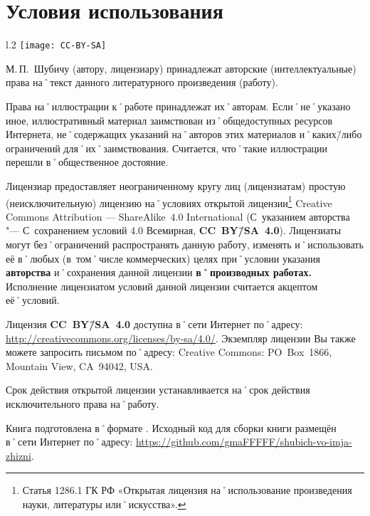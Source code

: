 ﻿%
\chapter{Условия использования}

\begin{wrapfigure}{l}{.2\textwidth}
\centering
\texttt{[image: CC-BY-SA]}
\label{fig:CC-BY-SA}
\end{wrapfigure}

\noindent М.\,П.~Шубичу (автору, лицензиару) принадлежат авторские (интеллектуальные) права на˚текст данного литературного произведения (работу). 

\noindent Права на˚иллюстрации к˚работе принадлежат их˚авторам. Если˚не˚указано иное, иллюстративный материал заимствован из˚общедоступных ресурсов Интернета, не˚содержащих указаний на˚авторов этих материалов и˚каких\=/либо ограничений для˚их˚заимствования. Считается, что˚такие иллюстрации перешли в˚общественное достояние.

Лицензиар предоставляет неограниченному кругу лиц (лицензиатам) простую (неисключительную) лицензию на˚условиях открытой лицензии\footnote
{Статья 1286.1 ГК РФ «Открытая лицензия на˚использование произведения науки, литературы или˚искусства».}
\foreignlanguage{english}{Creative Commons Attribution --- ShareAlike~4.0 International} (С~указанием авторства "--- С~сохранением условий 4.0 Всемирная, \textbf{CC~BY\=/SA~4.0}). Лицензиаты могут без˚ограничений распространять данную работу, изменять и˚использовать её в˚любых (в~том˚числе коммерческих) целях при˚условии указания \textbf{авторства} и˚сохранения данной лицензии \textbf{в˚производных работах.}
Исполнение лицензиатом условий данной лицензии считается акцептом её˚условий.

Лицензия \textbf{CC~BY\=/SA~4.0} доступна в˚сети Интернет по˚адресу: \url{http://creativecommons.org/licenses/by-sa/4.0/}. Экземпляр лицензии Вы также можете запросить письмом по˚адресу: \foreignlanguage{english}{Creative Commons: PO~Box~1866, Mountain View, CA~94042, USA.}

Срок действия открытой лицензии устанавливается на˚срок действия исключительного права на˚работу.

Книга подготовлена в˚формате \LaTeXe{}. Исходный код для сборки книги размещён в˚сети Интернет по˚адресу: \url{https://github.com/gmaFFFFF/shubich-vo-imja-zhizni}.{\sloppy

}%

